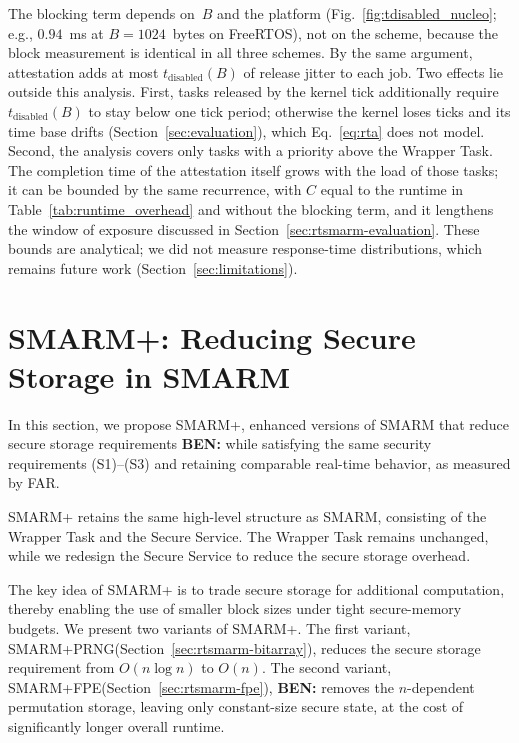 \documentclass{ieeeaccess}
\DeclareRobustCommand{\ben}[1]{{\color{BENcolor}\textbf{BEN:} #1}}
\newcommand{\rtsmarm}{SMARM+\xspace}
\newcommand{\rtsmarmone}{SMARM+PRNG\xspace}
\newcommand{\rtsmarmtwo}{SMARM+FPE\xspace}
\begin{document}
{The blocking term depends on~$B$ and the platform (Fig.~\ref{fig:tdisabled_nucleo}; e.g., $0.94$~ms at $B = 1024$~bytes on FreeRTOS), not on the scheme, because the block measurement is identical in all three schemes.
By the same argument, attestation adds at most $t_{\text{disabled}}(B)$ of release jitter to each job.
Two effects lie outside this analysis.
First, tasks released by the kernel tick additionally require $t_{\text{disabled}}(B)$ to stay below one tick period; otherwise the kernel loses ticks and its time base drifts (Section~\ref{sec:evaluation}), which Eq.~\eqref{eq:rta} does not model.
Second, the analysis covers only tasks with a priority above the Wrapper Task.
The completion time of the attestation itself grows with the load of those tasks; it can be bounded by the same recurrence, with $C$ equal to the runtime in Table~\ref{tab:runtime_overhead} and without the blocking term, and it lengthens the window of exposure discussed in Section~\ref{sec:rtsmarm-evaluation}.
These bounds are analytical; we did not measure response-time distributions, which remains future work (Section~\ref{sec:limitations}).}


\section{\rtsmarm: Reducing Secure Storage in SMARM}
\label{sec:resmarm-design}


In this section, we propose \rtsmarm, enhanced versions of SMARM that reduce secure storage requirements \ben{while satisfying the same security requirements (S1)--(S3) and retaining comparable real-time behavior, as measured by FAR}.


\rtsmarm retains the same high-level structure as SMARM, consisting of the Wrapper Task and the Secure Service.
The Wrapper Task remains unchanged, while we redesign the Secure Service to reduce the secure storage overhead.

The key idea of \rtsmarm is to trade secure storage for additional computation, thereby enabling the use of smaller block sizes under tight secure-memory budgets.
We present two variants of \rtsmarm.
The first variant, \rtsmarmone (Section~\ref{sec:rtsmarm-bitarray}), reduces the secure storage requirement from $O(n \log n)$ to $O(n)$.
The second variant, \rtsmarmtwo (Section~\ref{sec:rtsmarm-fpe}), \ben{removes the $n$-dependent permutation storage, leaving only constant-size secure state}, at the cost of significantly longer overall runtime.
\end{document}
